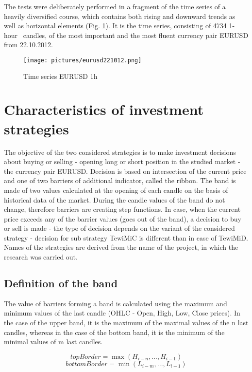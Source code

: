 \documentclass{tewiart}
\begin{document}
The tests were deliberately performed in a fragment of the time series of a heavily diversified course, which contains both rising and downward trends as well as horizontal elements (Fig. \ref{timeSeries}). It is the time series, consisting of 4734  \mbox{1-hour } candles, of the most important and the most fluent currency pair EURUSD from 22.10.2012.
\begin{figure}[h!]
\begin{center}
\texttt{[image: pictures/eurusd221012.png]}
\end{center}
\caption{Time series EURUSD 1h}
\label{timeSeries}
\end{figure}
\FloatBarrier
\section{Characteristics of investment strategies}
The objective of the two considered strategies is to make investment decisions about buying or selling - opening long or short position in the studied market - the currency pair EURUSD. Decision is based on intersection of the current price and one of two barriers of additional indicator, called the ribbon. The band is made of two values calculated at the opening of each candle on the basis of historical data of the market. During the candle values of the band do not change, therefore barriers are creating step functions. In case, when the current price exceeds any of the barrier values (goes out of the band), a decision to buy or sell is made - the type of decision depends on the variant of the considered strategy - decision for sub strategy TewiMiC is different than in case of TewiMiD. Names of the strategies are derived from the name of the project, in which the research was carried out.

\subsection{Definition of the band}
The value of barriers forming a band is calculated using the maximum and minimum values of the last candle (OHLC - Open, High, Low, Close prices). In the case of the upper band, it is the maximum of the maximal values of the n last candles, whereas in the case of the bottom band, it is the minimum of the minimal values of m last candles. 

\begin{equation}
topBorder = \max{(H_{i-n},...,H_{i-1})}
\end{equation}
\begin{equation}
bottomBorder = \min{(L_{i-m},...,L_{i-1})}
\end{equation}
\end{document}
